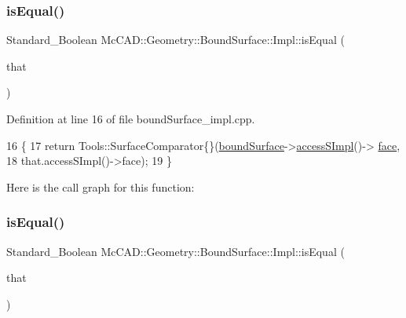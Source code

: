 \mbox{\label{classMcCAD_1_1Geometry_1_1BoundSurface_1_1Impl_a1b298b978b9c10e6dbdb160ce1ce17f9}} 
\subsubsection{\texorpdfstring{is\+Equal()}{isEqual()}\hspace{0.1cm}{\footnotesize\ttfamily [1/2]}}
{\footnotesize\ttfamily Standard\+\_\+\+Boolean Mc\+C\+A\+D\+::\+Geometry\+::\+Bound\+Surface\+::\+Impl\+::is\+Equal (\begin{DoxyParamCaption}\item[{const \hyperlink{classMcCAD_1_1Geometry_1_1BoundSurface}{Bound\+Surface} \&}]{that }\end{DoxyParamCaption})}



Definition at line 16 of file bound\+Surface\+\_\+impl.\+cpp.


\begin{DoxyCode}
16                                                                            \{
17     \textcolor{keywordflow}{return} Tools::SurfaceComparator\{\}(\hyperlink{classMcCAD_1_1Geometry_1_1BoundSurface_1_1Impl_a6e9a9a98f22310d56cf46937aca346e3}{boundSurface}->\hyperlink{classMcCAD_1_1Geometry_1_1Surface_a989de1f9ebe3de043412014ed25e52eb}{accessSImpl}()->
      \hyperlink{classMcCAD_1_1Geometry_1_1Surface_1_1Impl_abf7c4dc859404ce42b425c7d6b578f69}{face},
18                                       that.accessSImpl()->face);
19 \}
\end{DoxyCode}
Here is the call graph for this function\+:
\mbox{\label{classMcCAD_1_1Geometry_1_1BoundSurface_1_1Impl_a1b298b978b9c10e6dbdb160ce1ce17f9}} 
\subsubsection{\texorpdfstring{is\+Equal()}{isEqual()}\hspace{0.1cm}{\footnotesize\ttfamily [2/2]}}
{\footnotesize\ttfamily Standard\+\_\+\+Boolean Mc\+C\+A\+D\+::\+Geometry\+::\+Bound\+Surface\+::\+Impl\+::is\+Equal (\begin{DoxyParamCaption}\item[{const \hyperlink{classMcCAD_1_1Geometry_1_1BoundSurface}{Bound\+Surface} \&}]{that }\end{DoxyParamCaption})}



